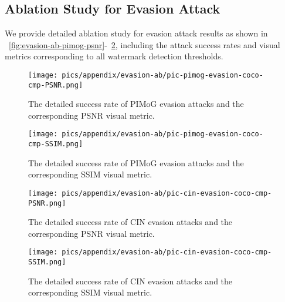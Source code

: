 \subsection{Ablation Study for Evasion Attack}
\label{sec:appendix:Ablation_Study_for_Evasion_Attack}
We provide detailed ablation study for evasion attack results as shown in ~\cref{fig:evasion-ab-pimog-psnr}-~\cref{fig:evasion-ab-cin-ssim}, including the attack success rates and visual metrics corresponding to all watermark detection thresholds.

\begin{figure}[!t]
\begin{minipage}{0.48\linewidth}
    \centering
    \texttt{[image: pics/appendix/evasion-ab/pic-pimog-evasion-coco-cmp-PSNR.png]} 
    \vspace{-6mm}
    \caption{The detailed success rate of PIMoG evasion attacks and the corresponding PSNR visual metric.}
    \label{fig:evasion-ab-pimog-psnr}
\end{minipage}\hfill
\begin{minipage}{0.48\linewidth}
    \centering
    \texttt{[image: pics/appendix/evasion-ab/pic-pimog-evasion-coco-cmp-SSIM.png]} 
    \vspace{-6mm}
    \caption{The detailed success rate of PIMoG evasion attacks and the corresponding SSIM visual metric.}
    \label{fig:evasion-ab-pimog-ssim}
\end{minipage}
\end{figure}

\begin{figure}[!t]
\begin{minipage}{0.48\linewidth}
    \centering
    \texttt{[image: pics/appendix/evasion-ab/pic-cin-evasion-coco-cmp-PSNR.png]} 
    \vspace{-6mm}
    \caption{The detailed success rate of CIN evasion attacks and the corresponding PSNR visual metric.}
    \label{fig:evasion-ab-cin-psnr}
\end{minipage}\hfill
\begin{minipage}{0.48\linewidth}
    \centering
    \texttt{[image: pics/appendix/evasion-ab/pic-cin-evasion-coco-cmp-SSIM.png]} 
    \vspace{-6mm}
    \caption{The detailed success rate of CIN evasion attacks and the corresponding SSIM visual metric.}
    \label{fig:evasion-ab-cin-ssim}
\end{minipage}
\end{figure}


